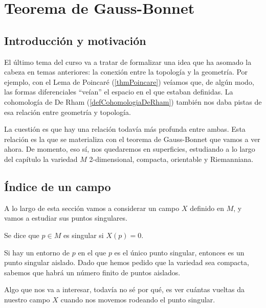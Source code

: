 \chapter{Teorema de Gauss-Bonnet}
\label{chapGaussBonnet}

\section{Introducción y motivación}

El último tema del curso va a tratar de formalizar una idea que ha asomado la cabeza en temas anteriores: la conexión entre la topología y la geometría. Por ejemplo, con el Lema de Poincaré (\ref{thmPoincare}) veíamos que, de algún modo, las formas diferenciales ``veían'' el espacio en el que estaban definidas. La cohomología de De Rham (\ref{defCohomologiaDeRham}) también nos daba pistas de esa relación entre geometría y topología.

La cuestión es que hay una relación todavía más profunda entre ambas. Esta relación es la que se materializa con el teorema de Gauss-Bonnet que vamos a ver ahora. De momento, eso sí, nos quedaremos en superficies, estudiando a lo largo del capítulo la variedad $M$ 2-dimensional, compacta, orientable y Riemanniana.

\section{Índice de un campo}

A lo largo de esta sección vamos a considerar un campo $X$ definido en $M$, y vamos a estudiar sus puntos singulares.

\begin{defn} Se dice que $p∈M$ es singular si $X(p) = 0$. \end{defn}

Si hay un entorno de $p$ en el que $p$ es el único punto singular, entonces es un punto singular aislado. Dado que hemos pedido que la variedad sea compacta, sabemos que habrá un número finito de puntos aislados.

Algo que nos va a interesar, todavía no sé por qué, es ver cuántas vueltas da nuestro campo $X$ cuando nos movemos rodeando el punto singular.

